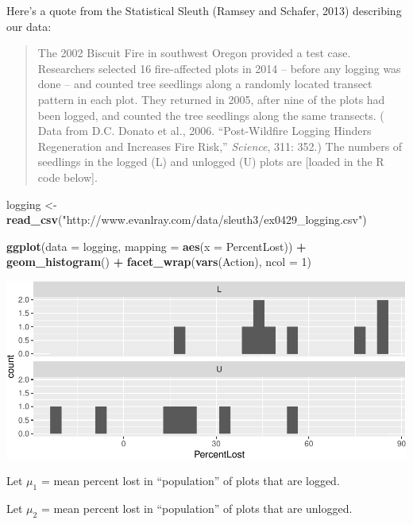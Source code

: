 \documentclass[]{article}
\newenvironment{Shaded}{\begin{snugshade}}{\end{snugshade}}
\newcommand{\KeywordTok}[1]{\textcolor[rgb]{0.13,0.29,0.53}{\textbf{#1}}}
\newcommand{\DataTypeTok}[1]{\textcolor[rgb]{0.13,0.29,0.53}{#1}}
\newcommand{\DecValTok}[1]{\textcolor[rgb]{0.00,0.00,0.81}{#1}}
\newcommand{\StringTok}[1]{\textcolor[rgb]{0.31,0.60,0.02}{#1}}
\newcommand{\OperatorTok}[1]{\textcolor[rgb]{0.81,0.36,0.00}{\textbf{#1}}}
\newcommand{\NormalTok}[1]{#1}
\begin{document}
Here's a quote from the Statistical Sleuth (Ramsey and Schafer, 2013)
describing our data:

\begin{quote}
The 2002 Biscuit Fire in southwest Oregon provided a test case.
Researchers selected 16 fire-affected plots in 2014 -- before any
logging was done -- and counted tree seedlings along a randomly located
transect pattern in each plot. They returned in 2005, after nine of the
plots had been logged, and counted the tree seedlings along the same
transects. ( Data from D.C. Donato et al., 2006. ``Post-Wildfire Logging
Hinders Regeneration and Increases Fire Risk,'' \emph{Science}, 311:
352.) The numbers of seedlings in the logged (L) and unlogged (U) plots
are {[}loaded in the R code below{]}.
\end{quote}

\begin{Shaded}
\begin{Highlighting}[]
\NormalTok{logging <-}\StringTok{ }\KeywordTok{read_csv}\NormalTok{(}\StringTok{"http://www.evanlray.com/data/sleuth3/ex0429_logging.csv"}\NormalTok{)}

\KeywordTok{ggplot}\NormalTok{(}\DataTypeTok{data =}\NormalTok{ logging, }\DataTypeTok{mapping =} \KeywordTok{aes}\NormalTok{(}\DataTypeTok{x =}\NormalTok{ PercentLost)) }\OperatorTok{+}
\StringTok{  }\KeywordTok{geom_histogram}\NormalTok{() }\OperatorTok{+}
\StringTok{  }\KeywordTok{facet_wrap}\NormalTok{(}\KeywordTok{vars}\NormalTok{(Action), }\DataTypeTok{ncol =} \DecValTok{1}\NormalTok{)}
\end{Highlighting}
\end{Shaded}

\includegraphics{20180422_permutation_test_setup_files/figure-latex/unnamed-chunk-1-1.pdf}

Let \(\mu_1\) = mean percent lost in ``population'' of plots that are
logged.

Let \(\mu_2\) = mean percent lost in ``population'' of plots that are
unlogged.
\end{document}
